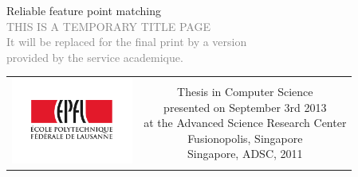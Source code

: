 \begin{titlepage}
\begin{center}
\sffamily


\null\vspace{2cm}
{\huge Reliable feature point matching} \\[24pt] 
\textcolor{gray}{\small{THIS IS A TEMPORARY TITLE PAGE \\ It will be 
replaced for the final print by a version \\ provided by the service 
academique.}}
    
\vfill

\begin{tabular} {cc}
\parbox{0.3\textwidth}{\includegraphics[width=4cm]{images/epfl}}
&
\parbox{0.7\textwidth}{%
	Thesis in Computer Science\\
	presented on September 3rd 2013\\
	at the Advanced Science Research Center\\
	Fusionopolis, Singapore\\
	
%
Singapore, ADSC, 2011}
\end{tabular}
\end{center}
\vspace{2cm}
\end{titlepage}



